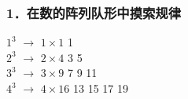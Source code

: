 \documentclass[aspectratio=169]{beamer}
\begin{document}
    \begin{frame}
    \frametitle{1．在数的阵列队形中摸索规律}
    \colorbox{green!70!yellow}{$ 1^3 $}   $ \longrightarrow $   \colorbox{green!70!yellow}{$ 1 \times 1 $}  
    \hspace{2.1cm}  \colorbox{green!70!yellow}{1}
     \\ \vspace{1em}
     \colorbox{green!70!blue}{$ 2^3 $}    $ \longrightarrow $   \colorbox{green!70!blue}{$ 2 \times 4 $}   
      \hspace{2.1cm}    \colorbox{green!70!blue}{3}  \hspace{1cm}   \colorbox{green!70!blue}{5} 
     \\ \vspace{1em}
      \colorbox{green!50!blue}{$ 3^3 $}     $ \longrightarrow $   \colorbox{green!50!blue}{$ 3 \times 9 $}   
       \hspace{2.1cm}    \colorbox{green!50!blue}{7}  
       \hspace{1cm} \colorbox{green!50!blue}{9} 
        \hspace{1cm} \colorbox{green!50!blue}{11} 
      \\  \vspace{1em}
       \colorbox{green!50!black}{$ 4^3 $}    $ \longrightarrow $  \colorbox{green!50!black}{$ 4 \times 16 $}  
        \hspace{1.9cm}   \colorbox{green!50!black}{13} 
         \hspace{0.85cm} \colorbox{green!50!black}{15} 
         \hspace{0.85cm} \colorbox{green!50!black}{17} 
          \hspace{0.85cm} \colorbox{green!50!black}{19} 
        \\
    
    \end{frame}
\end{document}
